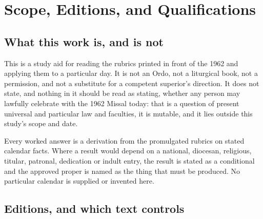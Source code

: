 \section{Scope, Editions, and Qualifications}

\subsection{What this work is, and is not}

This is a study aid for reading the rubrics printed in front of the 1962
 and applying them to a particular day. It is not an
Ordo, not a liturgical book, not a permission, and not a substitute for a
competent superior's direction. It does not state, and nothing in it should be
read as stating, whether any person may lawfully celebrate with the 1962
Missal today: that is a question of present universal and particular law and
faculties, it is mutable, and it lies outside this study's scope and date.

Every worked answer is a derivation from the promulgated rubrics on stated
calendar facts. Where a result would depend on a national, diocesan,
religious, titular, patronal, dedication or indult entry, the result is stated
as a conditional and the approved proper is named as the thing that must be
produced. No particular calendar is supplied or invented here.

\subsection{Editions, and which text controls}

